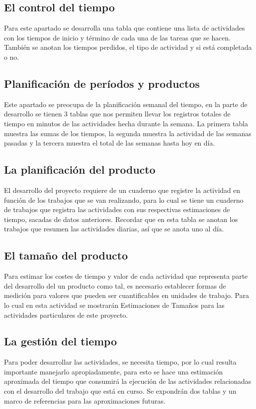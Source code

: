 \documentclass[a4paper,12pt,openany,oneside]{book}
\begin{document}
\subsection{El control del tiempo}
Para este apartado se desarrolla una tabla que contiene una lista de actividades con los tiempos de inicio y término de cada una de las tareas que se hacen. También se anotan los tiempos perdidos, el tipo de actividad y si está completada o no.
\subsection{Planificación de períodos y productos}
Este apartado se preocupa de la planificación semanal del tiempo, en la parte de desarrollo se tienen 3 tablas que nos permiten llevar los registros totales de tiempo en minutos de las actividades hecha durante la semana. La primera tabla muestra las sumas de los tiempos, la segunda muestra la actividad de las semanas pasadas y la tercera muestra el total de las semanas hasta hoy en día.
\subsection{La planificación del producto}
El desarrollo del proyecto requiere de un cuaderno que registre la actividad en función de los trabajos que se van realizando, para lo cual se tiene un cuaderno de trabajos que registra las actividades con sus respectivas estimaciones de tiempo, sacadas de datos anteriores. Recordar que en esta tabla se anotan los trabajos que resumen las actividades diarias, así que se anota uno al día.
\subsection{El tamaño del producto}
Para estimar los costes de tiempo y valor de cada actividad que representa parte del desarrollo del un producto como tal, es necesario establecer formas de medición para valores que pueden ser cuantificables en unidades de trabajo. Para lo cual en esta actividad se mostrarán Estimaciones de Tamaños para las actividades particulares de este proyecto.
\subsection{La gestión del tiempo}
Para poder desarrollar las actividades, se necesita tiempo, por lo cual resulta importante manejarlo apropiadamente, para esto se hace una estimación aproximada del tiempo que consumirá la ejecución de las actividades relacionadas con el desarrollo del trabajo que está en curso. Se expondrán dos tablas y un marco de referencias para las aproximaciones futuras.
\end{document}
